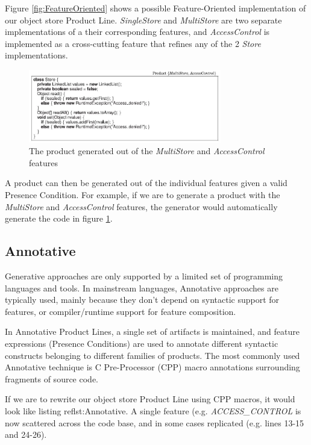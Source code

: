 \documentclass[11pt]{article}
\begin{document}
Figure \ref{fig:FeatureOriented} shows a possible Feature-Oriented implementation of our object store Product Line. \emph{SingleStore} and \emph{MultiStore} are two separate implementations of a their corresponding features, and \emph{AccessControl} is implemented as a cross-cutting feature that refines any of the 2 \emph{Store} implementations. 

\begin{figure}
  \centering
    \includegraphics[width=0.75\textwidth]{FeatureOrientedGenerated}
  \caption{The product generated out of the \emph{MultiStore} and \emph{AccessControl} features}
  \label{fig:FeatureOrientedGenerated}
\end{figure}

A product can then be generated out of the individual features given a valid Presence Condition. For example, if we are to generate a product with the \emph{MultiStore} and \emph{AccessControl} features, the generator would automatically generate the code in figure \ref{fig:FeatureOrientedGenerated}.

\subsection{Annotative}

Generative approaches are only supported by a limited set of programming languages and tools. In mainstream languages, Annotative approaches are typically used, mainly because they don't depend on syntactic support for features, or compiler/runtime support for feature composition.

In Annotative Product Lines, a single set of artifacts is maintained, and feature expressions (Presence Conditions) are used to annotate different syntactic constructs belonging to different families of products. The most commonly used Annotative technique is C Pre-Processor (CPP) macro annotations surrounding fragments of source code.

If we are to rewrite our object store Product Line using CPP macros, it would look like listing 
ref{lst:Annotative}. A single feature (e.g. \emph{ACCESS\_CONTROL} is now scattered across the code base, and in some cases replicated (e.g. lines 13-15 and 24-26).
  
\end{document}
